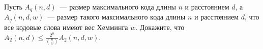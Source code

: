 Пусть $A_q(n, d)$~--- размер максимального кода длины $n$ и расстоянием $d$, а $A_q(n, d, w)$~--- размер
такого максимального кода длины $n$ и расстоянием $d$, что все кодовые слова имеют вес Хемминга
$w$. Докажите, что $A_2(n, d) \le \frac{2^n}{\binom{n}{w}} A_2(n, d, w)$.
